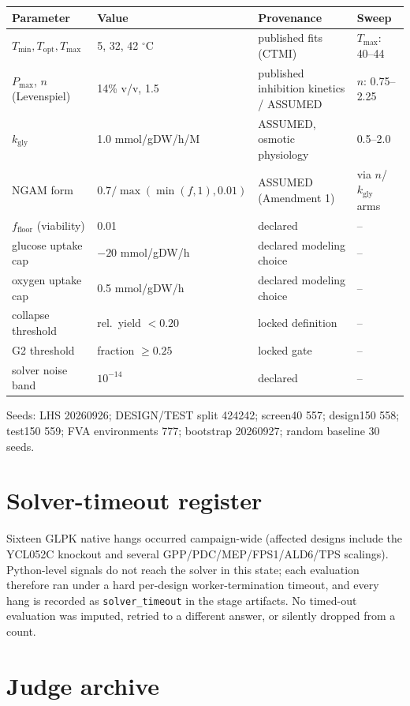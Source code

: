 \documentclass[12pt]{article}
\begin{document}
\begin{center}
\begin{tabular}{l l l l}
\hline
Parameter & Value & Provenance & Sweep \\
\hline
$T_{\min},T_{\mathrm{opt}},T_{\max}$ & 5, 32, 42 $^{\circ}$C & published fits (CTMI) & $T_{\max}$: 40--44 \\
$P_{\max}$, $n$ (Levenspiel) & 14\% v/v, 1.5 & published inhibition kinetics / ASSUMED & $n$: 0.75--2.25 \\
$k_{\mathrm{gly}}$ & 1.0 mmol/gDW/h/M & ASSUMED, osmotic physiology & 0.5--2.0 \\
NGAM form & $0.7/\max(\min(f,1),0.01)$ & ASSUMED (Amendment 1) & via $n$/$k_{\mathrm{gly}}$ arms \\
$f_{\mathrm{floor}}$ (viability) & 0.01 & declared & -- \\
glucose uptake cap & $-20$ mmol/gDW/h & declared modeling choice & -- \\
oxygen uptake cap & 0.5 mmol/gDW/h & declared modeling choice & -- \\
collapse threshold & rel.\ yield $< 0.20$ & locked definition & -- \\
G2 threshold & fraction $\ge 0.25$ & locked gate & -- \\
solver noise band & $10^{-14}$ & declared & -- \\
\hline
\end{tabular}
\end{center}

Seeds: LHS 20260926; DESIGN/TEST split 424242; screen40 557;
design150 558; test150 559; FVA environments 777; bootstrap 20260927;
random baseline 30 seeds.

\section{Solver-timeout register}
\label{app:solver}

Sixteen GLPK native hangs occurred campaign-wide (affected designs
include the YCL052C knockout and several GPP/PDC/MEP/FPS1/ALD6/TPS
scalings). Python-level signals do not reach the solver in this state;
each evaluation therefore ran under a hard per-design worker-termination
timeout, and every hang is recorded as \texttt{solver\_timeout} in the
stage artifacts. No timed-out evaluation was imputed, retried to a
different answer, or silently dropped from a count.

\section{Judge archive}
\label{app:judge}
\end{document}
